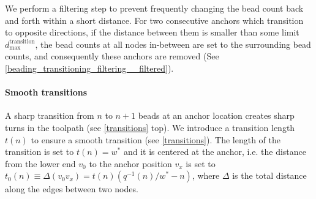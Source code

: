 We perform a filtering step to prevent frequently changing the bead count back and forth within a short distance.
For two consecutive anchors which transition to opposite directions, if the distance between them is smaller than some limit $d_\text{max}^\text{transition}$, the bead counts at all nodes in-between are set to the surrounding bead counts, and consequently these anchors are removed (See \cref{beading_transitioning_filtering__filtered}).







\paragraph{Smooth transitions}

A sharp transition from $n$ to $n+1$ beads at an anchor location creates sharp turns in the toolpath (see \cref{transitions} top).
We introduce a transition length $t(n)$ to ensure a smooth transition (see \cref{transitions}). 
The length of the transition is set to $t(n) = w^*$ and it is centered at the anchor, i.e. the distance from the lower end $v_0$ to the anchor position $v_x$ is set to
{$t_0(n) \equiv \Delta(v_0v_x) =  t(n) \left( q^{-1}(n) / w^*  - n \right)$,}
where $\Delta$ is the total distance along the edges between two nodes.



